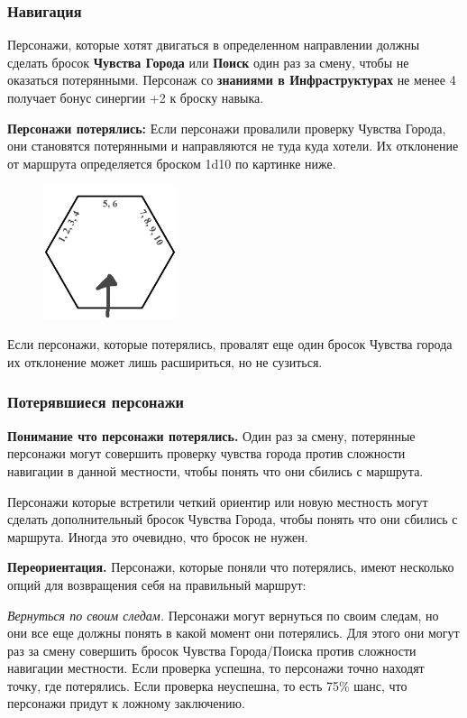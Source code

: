 \subsubsection*{Навигация}
Персонажи, которые хотят двигаться в определенном направлении должны сделать
бросок \textbf{Чувства Города} или \textbf{Поиск} один раз за смену, чтобы не оказаться потерянными.
Персонаж со \textbf{знаниями в Инфраструктурах} не менее 4 получает бонус синергии +2 к броску навыка.

\textbf{Персонажи потерялись:} Если персонажи провалили проверку Чувства Города, они становятся
потерянными и направляются не туда куда хотели. Их отклонение от маршрута определяется броском 1d10 по
картинке ниже.

\begin{figure}[H]
  \centering
  \includegraphics*[width=0.35\textwidth]{./img/hex.pdf}
\end{figure}

Если персонажи, которые потерялись, провалят еще один бросок Чувства города их отклонение может лишь расшириться, но не сузиться.

\subsubsection*{Потерявшиеся персонажи}

\textbf{Понимание что персонажи потерялись.} Один раз за смену, потерянные персонажи могут совершить 
проверку чувства города против сложности навигации в данной местности, чтобы понять что они сбились с маршрута.

Персонажи которые встретили четкий ориентир или новую местность могут сделать дополнительный бросок
Чувства Города, чтобы понять что они сбились с маршрута. Иногда это очевидно, что бросок не нужен.

\textbf{Переориентация.} Персонажи, которые поняли что потерялись, имеют несколько опций для возвращения себя на правильный маршрут:

\textit{Вернуться по своим следам.} Персонажи могут вернуться по своим следам, но они все еще должны понять
в какой момент они потерялись. Для этого они могут раз за смену совершить бросок Чувства Города/Поиска против
сложности навигации местности. Если проверка успешна, то персонажи точно находят точку, где потерялись. Если
проверка неуспешна, то есть 75\% шанс, что персонажи придут к ложному заключению.


